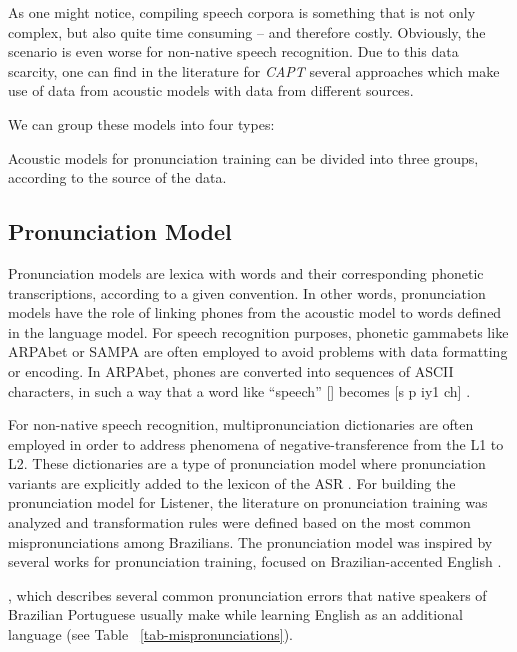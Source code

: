 \documentclass[twocolumn]{bmcart}%
\begin{document}
As one might notice, compiling speech corpora is something that is not only complex, but also quite time consuming -- and therefore costly. Obviously, the scenario is even worse for non-native speech recognition.
Due to this data scarcity, one can find in the literature for \emph{CAPT} several approaches which make use of data from acoustic models with data from different sources.

We can group these models into four types:


Acoustic models for pronunciation training can be divided into three groups,
according to the source of the data. 


\subsection*{\textbf{Pronunciation Model}}

Pronunciation models are lexica with words and their corresponding phonetic transcriptions, according to a given convention. In other words, pronunciation models have the role of linking phones from the acoustic model to words defined in the language model. For speech recognition purposes, phonetic gammabets like ARPAbet or SAMPA are often employed to avoid problems with data formatting or encoding. In ARPAbet, phones are converted into sequences of ASCII characters, in such a way that a word like ``speech'' [] becomes [s p iy1 ch] \cite{CMUDict2008}.

For non-native speech recognition, multipronunciation dictionaries are often employed in order to address phenomena of negative-transference from the L1 to L2. These dictionaries are a type of pronunciation model where pronunciation variants are explicitly added to the lexicon of the ASR \cite{Strik2001}. For building the pronunciation model for Listener, the literature on pronunciation training was analyzed and transformation rules were defined based on the most common mispronunciations among Brazilians. The pronunciation model was inspired by several works for pronunciation training, focused on Brazilian-accented English \citep{Zimmer2004, Zimmer2009, Cristofaro2015}.


, which describes several common pronunciation errors that native speakers of Brazilian Portuguese usually make while learning English as an additional language (see Table ~\ref{tab-mispronunciations}).
\end{document}
